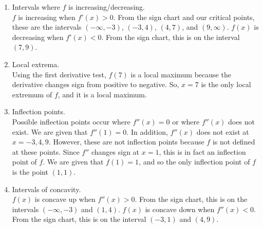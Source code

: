 \documentclass[nooutcomes,handout]{ximera}
\begin{document}
\begin{problem}
\begin{freeResponse}
\begin{enumerate}
      \item
        Intervals where $f$ is increasing/decreasing.  \\
        $f$ is increasing when $f'(x)>0$.
        From the sign chart and our critical points, these are the intervals $(-\infty ,-3)$, $(-3,4)$, $(4,7)$, and $(9,\infty )$.
        $f(x)$ is decreasing when $f'(x)<0$.
        From the sign chart, this is on the interval $(7,9)$.
			
      \item
        Local extrema.  \\
        Using the first derivative test, $f(7)$ is a local maximum because the derivative changes sign from positive to negative.  So, $x=7$ is the only local extremum of $f$, and it is a local maximum.
			
      \item
        Inflection points.  \\
        Possible inflection points occur where $f''(x)=0$ or where $f''(x)$ does not exist.
        We are given that $f''(1)=0$.
        In addition, $f''(x)$ does not exist at $x=-3,4,9$.
        However, these are not inflection points because $f$ is not defined at these points.
        Since $f''$ changes sign at $x=1$, this is in fact an inflection point of $f$.
        We are given that $f(1) = 1$, and so the only inflection point of $f$ is the point $(1,1)$.  
			
      \item
        Intervals of concavity.  \\
        $f(x)$ is concave up when $f''(x)>0$.
        From the sign chart, this is on the intervals $(-\infty ,-3)$ and $(1,4)$.
        $f(x)$ is concave down when $f''(x)<0$.
        From the sign chart, this is on the interval $(-3,1)$ and $(4,9)$.
        

\end{enumerate}
\end{freeResponse}
\end{problem}
\end{document}
